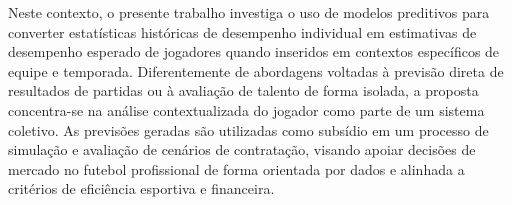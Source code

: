 Neste contexto, o presente trabalho investiga o uso de modelos preditivos para converter estatísticas históricas de desempenho individual em estimativas de 
desempenho esperado de jogadores quando inseridos em contextos específicos de equipe e temporada. Diferentemente de abordagens voltadas à previsão direta de 
resultados de partidas ou à avaliação de talento de forma isolada, a proposta concentra-se na análise contextualizada do jogador como parte de um sistema coletivo. 
As previsões geradas são utilizadas como subsídio em um processo de simulação e avaliação de cenários de contratação, visando apoiar decisões de mercado no futebol 
profissional de forma orientada por dados e alinhada a critérios de eficiência esportiva e financeira.

